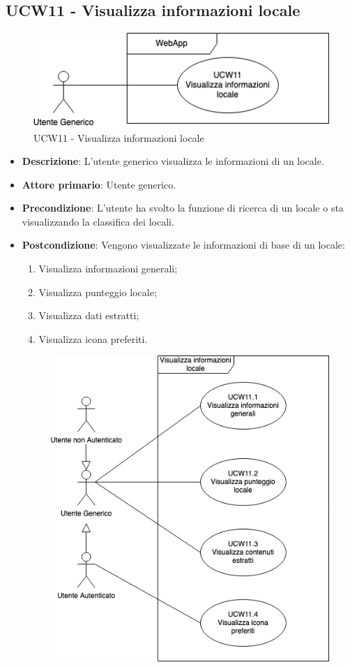 \subsection{UCW11 - Visualizza informazioni locale}
\begin{figure}[!h]
\centering
\includegraphics[scale=0.5]{UC_images/UCW11.png} 
\caption{UCW11 - Visualizza informazioni locale}
\end{figure}
\begin{itemize}
    \item \textbf{Descrizione}: L'utente generico visualizza le informazioni di un locale.
    \item \textbf{Attore primario}: Utente generico.
    \item \textbf{Precondizione}: L'utente ha svolto la funzione di ricerca di un locale o sta visualizzando la classifica dei locali.
    \item \textbf{Postcondizione}: Vengono visualizzate le informazioni di base di un locale:
    \begin{enumerate}
        \item Visualizza informazioni generali;
        \item Visualizza punteggio locale;
        \item Visualizza dati estratti;
        \item Visualizza icona preferiti.
        \end{enumerate}
    \begin{figure}[!h]
	\centering
		\includegraphics[scale=0.5]{UC_images/UCW11-.png} 

\end{figure}
\end{itemize}
